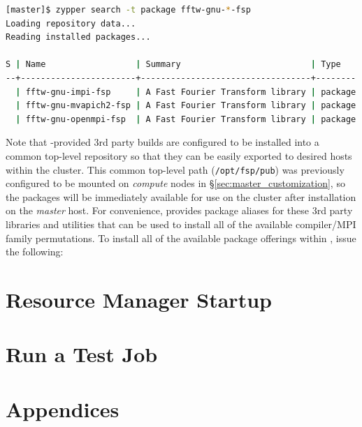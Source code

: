 \documentclass[letterpaper]{article}
\begin{document}
\begin{lstlisting}[language=bash]
[master]$ zypper search -t package fftw-gnu-*-fsp
Loading repository data...
Reading installed packages...

S | Name                  | Summary                          | Type   
--+-----------------------+----------------------------------+--------
  | fftw-gnu-impi-fsp     | A Fast Fourier Transform library | package
  | fftw-gnu-mvapich2-fsp | A Fast Fourier Transform library | package
  | fftw-gnu-openmpi-fsp  | A Fast Fourier Transform library | package
\end{lstlisting}

Note that \FSP{}-provided 3rd party builds are configured to be installed
into a common top-level repository so that they can be easily exported to
desired hosts within the cluster. This common top-level path
(\texttt{/opt/fsp/pub}) was previously configured to be mounted on {\em
  compute} nodes in \S\ref{sec:master_customization}, so the packages will be
immediately available for use on the cluster after installation on the {\em
  master} host.  For convenience, \FSP{} provides package aliases for these 3rd
party libraries and utilities that can be used to install all of the available
compiler/MPI family permutations. To install all of the available package
offerings within \FSP{}, issue the following:




\vspace*{0.2cm}

\section{Resource Manager Startup} \label{sec:rms_startup}


\section{Run a Test Job} \label{sec:test_job}


\clearpage
\appendix
\section*{Appendices}
\renewcommand{\thesubsection}{\Alph{subsection}}




\end{document}
